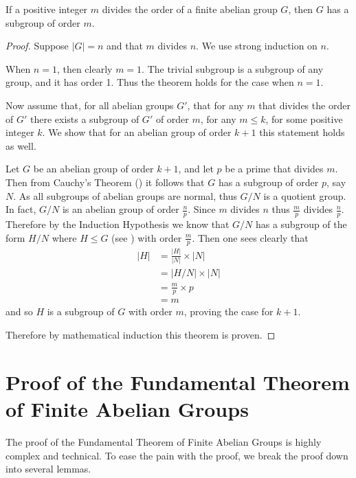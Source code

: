 \begin{theorem}
    If a positive integer $m$ divides the order of a finite abelian group $G$, then $G$ has a subgroup of order $m$.
\end{theorem}
\begin{proof}
    Suppose $|G| = n$ and that $m$ divides $n$. We use strong induction on $n$.

    When $n = 1$, then clearly $m = 1$. The trivial subgroup is a subgroup of any group, and it has order 1. Thus the theorem holds for the case when $n = 1$.

    Now assume that, for all abelian groups $G'$, that for any $m$ that divides the order of $G'$ there exists a subgroup of $G'$ of order $m$, for any $m \leq k$, for some positive integer $k$. We show that for an abelian group of order $k+1$ this statement holds as well.

    Let $G$ be an abelian group of order $k+1$, and let $p$ be a prime that divides $m$. Then from Cauchy's Theorem () it follows that $G$ has a subgroup of order $p$, say $N$. As all subgroups of abelian groups are normal, thus $G/N$ is a quotient group. In fact, $G/N$ is an abelian group of order $\frac np$. Since $m$ divides $n$ thus $\frac mp$ divides $\frac np$. Therefore by the Induction Hypothesis we know that $G/N$ has a subgroup of the form $H/N$ where $H \leq G$ (see ) with order $\frac mp$. Then one sees clearly that
    \begin{align*}
        |H| &= \frac{|H|}{|N|} \times |N|\\
        &= |H/N| \times |N|\\
        &= \frac mp \times p\\
        &= m
    \end{align*}
    and so $H$ is a subgroup of $G$ with order $m$, proving the case for $k+1$.

    Therefore by mathematical induction this theorem is proven.
\end{proof}

\section{Proof of the Fundamental Theorem of Finite Abelian Groups}
The proof of the Fundamental Theorem of Finite Abelian Groups is highly complex and technical. To ease the pain with the proof, we break the proof down into several lemmas.

